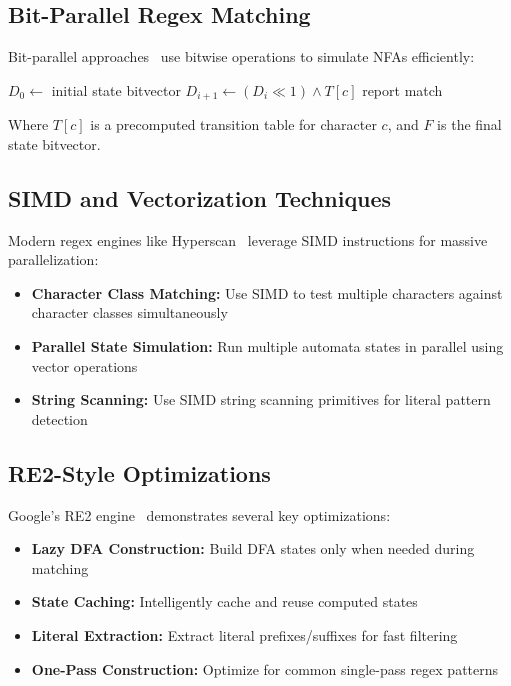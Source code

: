 \documentclass[11pt,a4paper]{article}
\begin{document}
\subsection{Bit-Parallel Regex Matching}

Bit-parallel approaches~\cite{baeza1992new,myers1999fast} use bitwise operations to simulate NFAs efficiently:

\begin{algorithm}
\caption{Bit-Parallel NFA Simulation}
\begin{algorithmic}[1]
\State $D_0 \gets$ initial state bitvector
    \State $D_{i+1} \gets (D_i \ll 1) \land T[c]$
        \State report match
    \EndIf
\EndFor
\end{algorithmic}
\end{algorithm}

Where $T[c]$ is a precomputed transition table for character $c$, and $F$ is the final state bitvector.

\subsection{SIMD and Vectorization Techniques}

Modern regex engines like Hyperscan~\cite{intel2016hyperscan} leverage SIMD instructions for massive parallelization:

\begin{itemize}
\item \textbf{Character Class Matching:} Use SIMD to test multiple characters against character classes simultaneously
\item \textbf{Parallel State Simulation:} Run multiple automata states in parallel using vector operations
\item \textbf{String Scanning:} Use SIMD string scanning primitives for literal pattern detection
\end{itemize}

\subsection{RE2-Style Optimizations}

Google's RE2 engine~\cite{cox2007regular} demonstrates several key optimizations:

\begin{itemize}
\item \textbf{Lazy DFA Construction:} Build DFA states only when needed during matching
\item \textbf{State Caching:} Intelligently cache and reuse computed states
\item \textbf{Literal Extraction:} Extract literal prefixes/suffixes for fast filtering
\item \textbf{One-Pass Construction:} Optimize for common single-pass regex patterns
\end{itemize}
\end{document}
